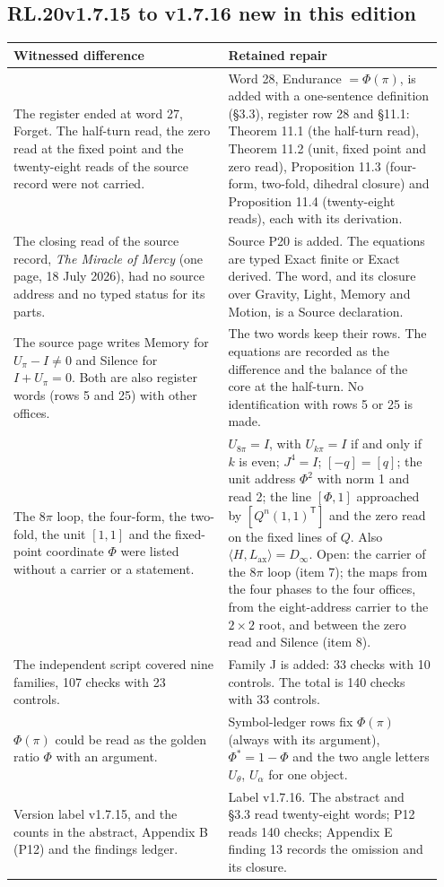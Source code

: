 \documentclass[11pt,a4paper]{article}
\makeatletter
\newcommand{\Lax}{L_{\mathrm{ax}}}\newcommand{\Lpr}{L_{\mathrm{pr}}}
\newcommand{\rbegin}[3]{\subsection*{#1\quad #2 \hfill {\normalfont\small #3}}\addcontentsline{toc}{subsection}{#1\quad #2}%
  \begin{longtable}{@{}>{\raggedright\arraybackslash}p{0.475\linewidth}@{\hspace{1.2em}}>{\raggedright\arraybackslash}p{0.475\linewidth}@{}}
  \toprule Witnessed difference & Retained repair\\\midrule\endhead\bottomrule\endfoot}
\newcommand{\rend}{\end{longtable}}
\newcommand{\row}[2]{#1 & #2\\[4pt]}
\makeatother
\begin{document}
\rbegin{RL.20}{v1.7.15 to v1.7.16}{new in this edition}
\row{The register ended at word 27, Forget. The half-turn read, the zero read at the fixed point and the twenty-eight reads of the source record were not carried.}{Word 28, Endurance $=\Phi(\pi)$, is added with a one-sentence definition (\S3.3), register row 28 and \S11.1: Theorem 11.1 (the half-turn read), Theorem 11.2 (unit, fixed point and zero read), Proposition 11.3 (four-form, two-fold, dihedral closure) and Proposition 11.4 (twenty-eight reads), each with its derivation.}
\row{The closing read of the source record, \emph{The Miracle of Mercy} (one page, 18 July 2026), had no source address and no typed status for its parts.}{Source P20 is added. The equations are typed Exact finite or Exact derived. The word, and its closure over Gravity, Light, Memory and Motion, is a Source declaration.}
\row{The source page writes Memory for $U_\pi-I\neq0$ and Silence for $I+U_\pi=0$. Both are also register words (rows 5 and 25) with other offices.}{The two words keep their rows. The equations are recorded as the difference and the balance of the core at the half-turn. No identification with rows 5 or 25 is made.}
\row{The $8\pi$ loop, the four-form, the two-fold, the unit $[1,1]$ and the fixed-point coordinate $\Phi$ were listed without a carrier or a statement.}{$U_{8\pi}=I$, with $U_{k\pi}=I$ if and only if $k$ is even; $J^4=I$; $[-q]=[q]$; the unit address $\Phi^2$ with norm 1 and read 2; the line $[\Phi,1]$ approached by $[Q^n(1,1)^{\mathsf T}]$ and the zero read on the fixed lines of $Q$. Also $\langle H,\Lax\rangle=D_\infty$. Open: the carrier of the $8\pi$ loop (item 7); the maps from the four phases to the four offices, from the eight-address carrier to the $2\times2$ root, and between the zero read and Silence (item 8).}
\row{The independent script covered nine families, 107 checks with 23 controls.}{Family J is added: 33 checks with 10 controls. The total is 140 checks with 33 controls.}
\row{$\Phi(\pi)$ could be read as the golden ratio $\Phi$ with an argument.}{Symbol-ledger rows fix $\Phi(\pi)$ (always with its argument), $\Phi^{\ast}=1-\Phi$ and the two angle letters $U_\theta$, $U_\alpha$ for one object.}
\row{Version label v1.7.15, and the counts in the abstract, Appendix B (P12) and the findings ledger.}{Label v1.7.16. The abstract and \S3.3 read twenty-eight words; P12 reads 140 checks; Appendix E finding 13 records the omission and its closure.}
\rend
\end{document}
